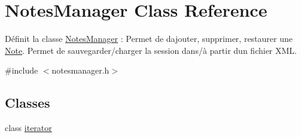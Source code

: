 \hypertarget{class_notes_manager}{}\section{Notes\+Manager Class Reference}
\label{class_notes_manager}


Définit la classe \hyperlink{class_notes_manager}{Notes\+Manager} \+: Permet de d\textquotesingle{}ajouter, supprimer, restaurer une \hyperlink{class_note}{Note}. Permet de sauvegarder/charger la session dans/à partir d\textquotesingle{}un fichier X\+ML.  




{\ttfamily \#include $<$notesmanager.\+h$>$}

\subsection*{Classes}
\begin{DoxyCompactItemize}
\item 
class \hyperlink{class_notes_manager_1_1iterator}{iterator}
\end{DoxyCompactItemize}
